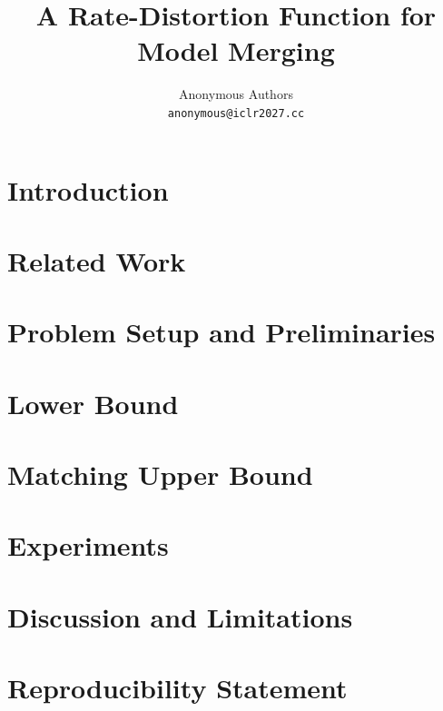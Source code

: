 \documentclass{article}
\title{A Rate-Distortion Function for Model Merging}
\author{Anonymous Authors\\
  \texttt{anonymous@iclr2027.cc}}
\date{}
\theoremstyle{definition}
\theoremstyle{remark}
\begin{document}
\maketitle

\begin{abstract}

\end{abstract}

\section{Introduction}


\section{Related Work}\label{sec:related_work}


\section{Problem Setup and Preliminaries}\label{sec:setup}


\section{Lower Bound}\label{sec:lower}\label{sec:lower_bound}


\section{Matching Upper Bound}\label{sec:achv}\label{sec:achievability}


\section{Experiments}\label{sec:exp}\label{sec:experiments}











\section{Discussion and Limitations}\label{sec:discussion}\label{sec:future}


\appendix


\section*{Reproducibility Statement}




\end{document}

